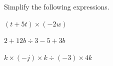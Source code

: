  Simplify the following expressions.

\begin{subparts}
  \item $(t+5t)\times(-2w)$
  \item $2+12b\div 3-5+3b$
  \item $k\times(-j)\times k\div(-3)\times 4k$
\end{subparts}

